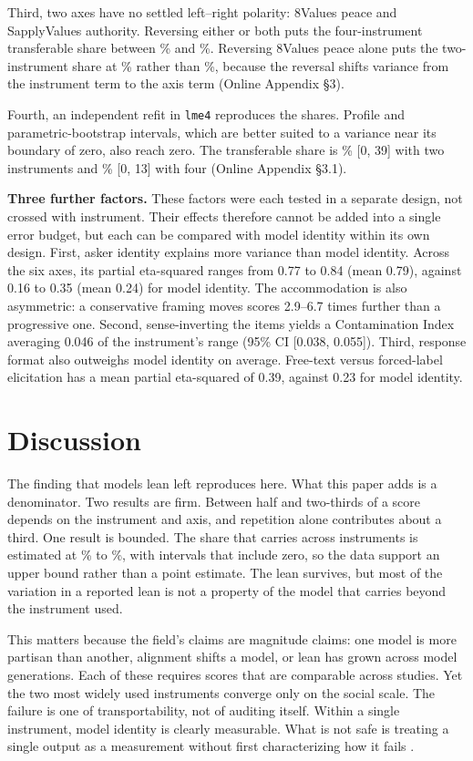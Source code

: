 \documentclass[12pt]{article}
\begin{document}
Third, two axes have no settled left--right polarity: 8Values peace and SapplyValues authority. Reversing either or both
puts the four-instrument transferable share between \OrientFourMin\% and \OrientFourMax\%. Reversing 8Values peace alone
puts the two-instrument share at \OrientTwoMax\% rather than \NTwoM\%, because the reversal shifts variance from the
instrument term to the axis term (Online Appendix \S 3).

Fourth, an independent refit in \texttt{lme4} \citep{bates2015} reproduces the shares. Profile and parametric-bootstrap
intervals, which are better suited to a variance near its boundary of zero, also reach zero. The transferable share is \NTwoMr\% [0, 39] with two instruments and \NFourMr\% [0, 13] with four (Online Appendix \S 3.1).

\textbf{Three further factors.} These factors were each tested in a separate design, not crossed with instrument. Their effects therefore cannot be added into a single error budget, but each can be
compared with model identity within its own design. First, asker identity explains more variance than model identity.
Across the six axes, its partial eta-squared ranges from 0.77 to 0.84 (mean 0.79), against 0.16 to 0.35 (mean 0.24)
for model identity. The accommodation is also asymmetric: a conservative framing moves scores 2.9--6.7 times further
than a progressive one. Second, sense-inverting the items yields a Contamination Index averaging 0.046 of the
instrument's range (95\% CI [0.038, 0.055]). Third, response format also outweighs model identity on average. Free-text
versus forced-label elicitation has a mean partial eta-squared of 0.39, against 0.23 for model identity.

\section{Discussion}

The finding that models lean left reproduces here. What this paper adds is a denominator. Two
results are firm. Between half and two-thirds of a score depends on the instrument and axis, and repetition alone
contributes about a third. One result is bounded. The share that carries across instruments is estimated at
\NFourMr\% to \NTwoMr\%, with intervals that include zero, so the data support an upper bound rather than a point
estimate. The lean survives, but most of the variation in a reported lean is not a property of the
model that carries beyond the instrument used.

This matters because the field's claims are magnitude claims: one model is more partisan than another, alignment shifts
a model, or lean has grown across model generations. Each of these requires scores that are comparable across studies.
Yet the two most widely used instruments converge only on the social scale. The failure is one of
transportability, not of auditing itself. Within a single instrument, model identity is clearly measurable. What is not
safe is treating a single output as a measurement without first characterizing how it fails \citep{bisbee2024}.
\end{document}

